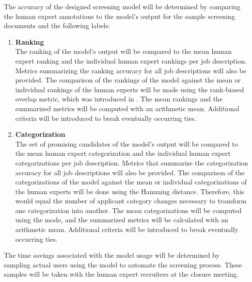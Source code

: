 \documentclass[draft,final]{thesisclass} %
\begin{document}
The accuracy of the designed screening model will be determined by comparing the human expert annotations to the model's output for the sample screening documents and the following labels:
\begin{enumerate}
    \item \textbf{Ranking}\\
    The ranking of the model's output will be compared to the mean human expert ranking and the individual human expert rankings per job description.
    Metrics summarizing the ranking accuracy for all job descriptions will also be provided.
    The comparison of the rankings of the model against the mean or individual rankings of the human experts will be made using the rank-biased overlap metric, which was introduced in \textcite{rank_biased_overlap}. 
    The mean rankings and the summarized metrics will be computed with an arithmetic mean.
    Additional criteria will be introduced to break eventually occurring ties.
    \item \textbf{Categorization}\\
    The set of promising candidates of the model's output will be compared to the mean human expert categorization and the individual human expert categorizations per job description.
    Metrics that summarize the categorization accuracy for all job descriptions will also be provided.
    The comparison of the categorizations of the model against the mean or individual categorizations of the human experts will be done using the Hamming distance.
    Therefore, this would equal the number of applicant category changes necessary to transform one categorization into another.
    The mean categorizations will be computed using the mode, and the summarized metrics will be calculated with an arithmetic mean.
    Additional criteria will be introduced to break eventually occurring ties.
\end{enumerate}

The time savings associated with the model usage will be determined by sampling actual users using the model to automate the screening process.
These samples will be taken with the human expert recruiters at the closure meeting.
\end{document}
